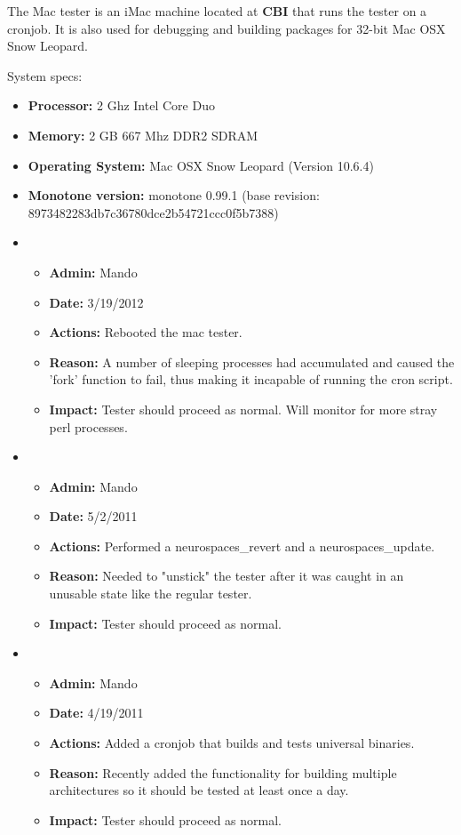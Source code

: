 \documentclass[12pt]{article}
\begin{document}
The Mac tester is an iMac machine located at {\bf CBI} that runs the tester on a cronjob. It is also used for debugging and building packages for 32-bit Mac OSX Snow Leopard.

System specs:
\begin{itemize}
\item[] {\bf Processor:} 2 Ghz Intel Core Duo
\item[] {\bf Memory:} 2 GB 667 Mhz DDR2 SDRAM
\item[] {\bf Operating System:} Mac OSX Snow Leopard (Version 10.6.4) 
\item[] {\bf Monotone version:} monotone 0.99.1 (base revision: 8973482283db7c36780dce2b54721ccc0f5b7388)
\end{itemize}

\begin{itemize}

\item
\begin{itemize}
\item[] {\bf Admin:} Mando
\item[] {\bf Date:} 3/19/2012 
\item[] {\bf Actions:}  Rebooted the mac tester.
\item[] {\bf Reason:} A number of sleeping processes had accumulated and caused the 'fork' function to fail, thus making it incapable of running the cron script.
\item[] {\bf Impact:}  Tester should proceed as normal. Will monitor for more stray perl processes.
\end{itemize}

\item
\begin{itemize}
\item[] {\bf Admin:} Mando
\item[] {\bf Date:} 5/2/2011 
\item[] {\bf Actions:}  Performed a neurospaces\_revert and a neurospaces\_update.
\item[] {\bf Reason:} Needed to "unstick" the tester after it was caught in an unusable state like the regular tester.
\item[] {\bf Impact:}  Tester should proceed as normal. 
\end{itemize}

\item
\begin{itemize}
\item[] {\bf Admin:} Mando
\item[] {\bf Date:} 4/19/2011 
\item[] {\bf Actions:}  Added a cronjob that builds and tests universal binaries.
\item[] {\bf Reason:} Recently added the functionality for building multiple architectures so it should be tested at least once a day.
\item[] {\bf Impact:}  Tester should proceed as normal. 
\end{itemize}


\end{itemize}
\end{document}
